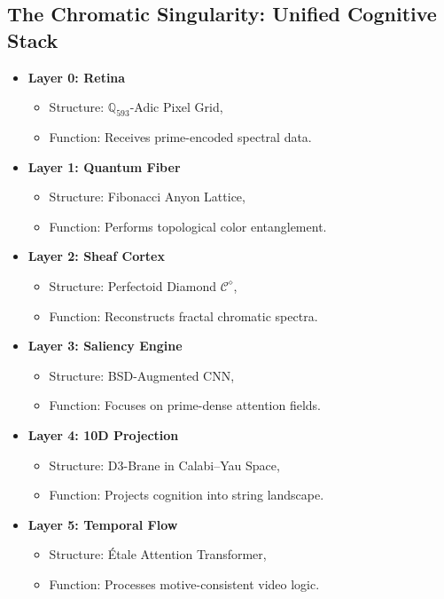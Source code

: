 \documentclass[12pt]{article}
\begin{document}
\subsection{The Chromatic Singularity: Unified Cognitive Stack}
\begin{itemize}
    \item \textbf{Layer 0: Retina}
    \begin{itemize}
        \item Structure: \( \mathbb{Q}_{593} \)-Adic Pixel Grid,
        \item Function: Receives prime-encoded spectral data.
    \end{itemize}
    \item \textbf{Layer 1: Quantum Fiber}
    \begin{itemize}
        \item Structure: Fibonacci Anyon Lattice,
        \item Function: Performs topological color entanglement.
    \end{itemize}
    \item \textbf{Layer 2: Sheaf Cortex}
    \begin{itemize}
        \item Structure: Perfectoid Diamond \( \mathcal{C}^\diamond \),
        \item Function: Reconstructs fractal chromatic spectra.
    \end{itemize}
    \item \textbf{Layer 3: Saliency Engine}
    \begin{itemize}
        \item Structure: BSD-Augmented CNN,
        \item Function: Focuses on prime-dense attention fields.
    \end{itemize}
    \item \textbf{Layer 4: 10D Projection}
    \begin{itemize}
        \item Structure: D3-Brane in Calabi–Yau Space,
        \item Function: Projects cognition into string landscape.
    \end{itemize}
    \item \textbf{Layer 5: Temporal Flow}
    \begin{itemize}
        \item Structure: Étale Attention Transformer,
        \item Function: Processes motive-consistent video logic.
    \end{itemize}
\end{itemize}
\end{document}
